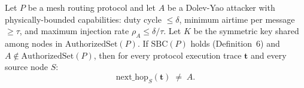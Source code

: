 

\begin{theorem}
\label{thm:sbc-sufficiency}
Let $P$ be a mesh routing protocol and let $A$ be a Dolev-Yao attacker with
physically-bounded capabilities: duty cycle $\leq \delta$, minimum airtime per
message $\geq \tau$, and maximum injection rate $\rho_{A} \leq \delta/\tau$.
Let $K$ be the symmetric key shared among nodes in $\mathrm{AuthorizedSet}(P)$.
If $\mathrm{SBC}(P)$ holds (Definition~6) and $A \notin \mathrm{AuthorizedSet}(P)$,
then for every protocol execution trace $\mathbf{t}$ and every source node $S$:
\[
  \mathrm{next\_hop}_{S}(\mathbf{t}) \;\neq\; A.
\]
\end{theorem}


